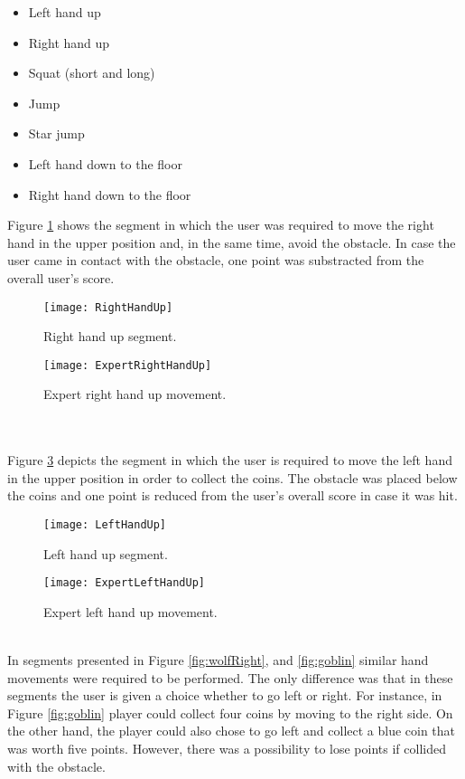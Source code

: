 \begin{itemize}
\item Left hand up
\item Right hand up
\item Squat (short and long)
\item Jump
\item Star jump
\item Left hand down to the floor
\item Right hand down to the floor
\end{itemize}
Figure \ref{fig:rightup} shows the segment in which the user was required to move the right hand in the upper position and, in the same time, avoid the obstacle. In case the user came in contact with the obstacle, one point was substracted from the overall user's score.\\
\begin{figure}[h]
    \centering
    \texttt{[image: RightHandUp]}
    \caption{Right hand up segment.}
    \label{fig:rightup}
\end{figure}
\begin{figure}[h]
    \centering
    \texttt{[image: ExpertRightHandUp]}
    \caption{Expert right hand up movement.}
    \label{fig:expertRightHandUp}
\end{figure}\\\\
Figure \ref{fig:leftup} depicts the segment in which the user is required to move the left hand in the upper position in order to collect the coins. The obstacle was placed below the coins and one point is reduced from the user's overall score in case it was hit.\\
\begin{figure}[h]
    \centering
    \texttt{[image: LeftHandUp]}
    \caption{Left hand up segment.}
    \label{fig:leftup}
\end{figure}
\begin{figure}[h]
    \centering
    \texttt{[image: ExpertLeftHandUp]}
    \caption{Expert left hand up movement.}
    \label{fig:leftHandUp}
\end{figure}\\
In segments presented in Figure \ref{fig:wolfRight}, and \ref{fig:goblin} similar hand movements were required to be performed. The only difference was that in these segments the user is given a choice whether to go left or right. For instance, in Figure \ref{fig:goblin} player could collect four coins by moving to the right side. On the other hand, the player could also chose to go left and collect a blue coin that was worth five points. However, there was a possibility to lose points if collided with the obstacle.\\
